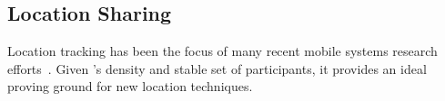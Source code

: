 \subsection{Location Sharing}
\label{subsec-locationsharing}

Location tracking has been the focus of many recent mobile systems research
efforts~\cite{FIXME,FIXME,FIXME}. Given \PhoneLab{}'s density and stable set
of participants, it provides an ideal proving ground for new location
techniques.
